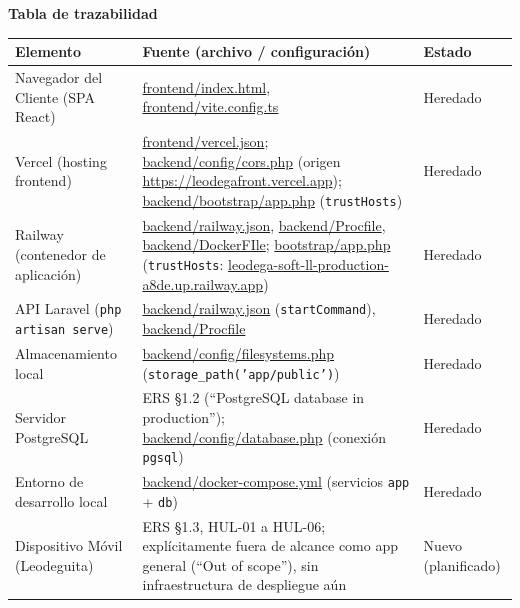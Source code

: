 \bigskip
\noindent\textbf{Tabla de trazabilidad}
\begin{longtable}{|L{5.5cm}|L{7cm}|M{2cm}|}
\hline
{} \textbf{Elemento} & \textbf{Fuente (archivo / configuración)} & \textbf{Estado} \\ \hline
\endhead
Navegador del Cliente (SPA React) & \url{frontend/index.html}, \url{frontend/vite.config.ts} & Heredado \\ \hline
Vercel (hosting frontend) & \url{frontend/vercel.json}; \url{backend/config/cors.php} (origen \url{https://leodegafront.vercel.app}); \url{backend/bootstrap/app.php} (\texttt{trustHosts}) & Heredado \\ \hline
Railway (contenedor de aplicación) & \url{backend/railway.json}, \url{backend/Procfile}, \url{backend/DockerFIle}; \url{bootstrap/app.php} (\texttt{trustHosts}: \url{leodega-soft-ll-production-a8de.up.railway.app}) & Heredado \\ \hline
API Laravel (\texttt{php artisan serve}) & \url{backend/railway.json} (\texttt{startCommand}), \url{backend/Procfile} & Heredado \\ \hline
Almacenamiento local & \url{backend/config/filesystems.php} (\texttt{storage\_path('app/public')}) & Heredado \\ \hline
Servidor PostgreSQL & ERS \S1.2 (``PostgreSQL database in production''); \url{backend/config/database.php} (conexión \texttt{pgsql}) & Heredado \\ \hline
Entorno de desarrollo local & \url{backend/docker-compose.yml} (servicios \texttt{app} + \texttt{db}) & Heredado \\ \hline
Dispositivo Móvil (Leodeguita) & ERS \S1.3, HUL-01 a HUL-06; explícitamente fuera de alcance como app general (``Out of scope''), sin infraestructura de despliegue aún & Nuevo (planificado) \\ \hline
\end{longtable}
\clearpage
